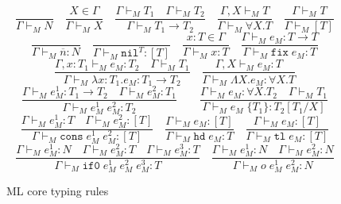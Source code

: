\begin{figure}
\[
\frac{}{\Gamma\vdash_{M}N}
\quad
\frac{X\in\Gamma}{\Gamma\vdash_{M}X}
\quad
\frac{\Gamma\vdash_{M}T_{1}\quad\Gamma\vdash_{M}T_{2}}{\Gamma\vdash_{M}T_{1}\rightarrow T_{2}}
\quad
\frac{\Gamma,X\vdash_{M}T}{\Gamma\vdash_{M}\forall X.T}
\quad
\frac{\Gamma\vdash_{M}T}{\Gamma\vdash_{M}[T]}
\]
\bigskip
\[
\frac{}{\Gamma\vdash_{M}\overline{n}:N}
\quad
\frac{}{\Gamma\vdash_{M}\mathtt{nil}^{T}:[T]}
\quad
\frac{x:T\in\Gamma}{\Gamma\vdash_{M}x:T}
\quad
\frac{\Gamma\vdash_{M}e_{M}:T\rightarrow T}{\Gamma\vdash_{M}\mathtt{fix}\;e_{M}:T}
\]
\[
\frac{\Gamma,x:T_{1}\vdash_{M}e_{M}:T_{2}\quad\Gamma\vdash_{M}T_{1}}{\Gamma\vdash_{M}\lambda x:T_{1}.e_{M}:T_{1}\rightarrow T_{2}}
\quad
\frac{\Gamma,X\vdash_{M}e_{M}:T}{\Gamma\vdash_{M}\Lambda X.e_{M}:\forall X.T}
\]
\[
\frac{\Gamma\vdash_{M}e_{M}^{1}:T_{1}\rightarrow T_{2}\quad\Gamma\vdash_{M}e_{M}^{2}:T_{1}}{\Gamma\vdash_{M}e_{M}^{1}\;e_{M}^{2}:T_{2}}
\quad
\quad
\frac{\Gamma\vdash_{M}e_{M}:\forall X.T_{2}\quad\Gamma\vdash_{M}T_{1}}{\Gamma\vdash_{M}e_{M}\;\lbrace T_{1}\rbrace:T_{2}[T_{1}/X]}
\]
\[
\frac{\Gamma\vdash_{M}e_{M}^{1}:T\quad\Gamma\vdash_{M}e_{M}^{2}:[T]}{\Gamma\vdash_{M}\mathtt{cons}\;e_{M}^{1}\;e_{M}^{2}:[T]}
\quad
\frac{\Gamma\vdash_{M}e_{M}:[T]}{\Gamma\vdash_{M}\mathtt{hd}\;e_{M}:T}
\quad
\frac{\Gamma\vdash_{M}e_{M}:[T]}{\Gamma\vdash_{M}\mathtt{tl}\;e_{M}:[T]}
\]
\[
\frac{\Gamma\vdash_{M}e_{M}^{1}:N\quad\Gamma\vdash_{M}e_{M}^{2}:T\quad\Gamma\vdash_{M}e_{M}^{3}:T}{\Gamma\vdash_{M}\mathtt{if0}\;e_{M}^{1}\;e_{M}^{2}\;e_{M}^{3}:T}
\quad
\frac{\Gamma\vdash_{M}e_{M}^{1}:N\quad\Gamma\vdash_{M}e_{M}^{2}:N}{\Gamma\vdash_{M}o\;e_{M}^{1}\;e_{M}^{2}:N}
\]
\caption{ML core typing rules}
\label{mctr}
\end{figure}